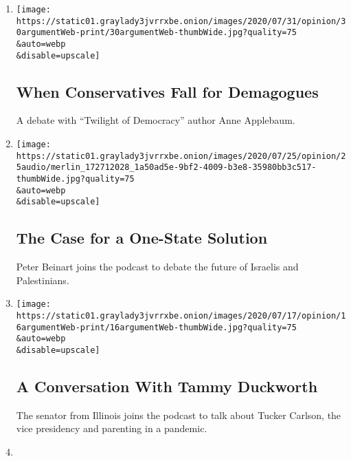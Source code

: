 \begin{enumerate}
\def\labelenumi{\arabic{enumi}.}
\item
  \href{/2020/07/30/opinion/the-argument-authoritarianism-anne-applebaum.html}{}

  \texttt{[image: https://static01.graylady3jvrrxbe.onion/images/2020/07/31/opinion/30argumentWeb-print/30argumentWeb-thumbWide.jpg?quality=75\\\&auto=webp\\\&disable=upscale]}

  \hypertarget{when-conservatives-fall-for-demagogues}{%
  \subsection{When Conservatives Fall for
  Demagogues}\label{when-conservatives-fall-for-demagogues}}

  A debate with ``Twilight of Democracy'' author Anne Applebaum.
\item
  \href{/2020/07/23/opinion/the-argument-israel-palestinian.html}{}

  \texttt{[image: https://static01.graylady3jvrrxbe.onion/images/2020/07/25/opinion/25audio/merlin\_172712028\_1a50ad5e-9bf2-4009-b3e8-35980bb3c517-thumbWide.jpg?quality=75\\\&auto=webp\\\&disable=upscale]}

  \hypertarget{the-case-for-a-one-state-solution}{%
  \subsection{The Case for a One-State
  Solution}\label{the-case-for-a-one-state-solution}}

  Peter Beinart joins the podcast to debate the future of Israelis and
  Palestinians.
\item
  \href{/2020/07/16/opinion/the-argument-tammy-duckworth.html}{}

  \texttt{[image: https://static01.graylady3jvrrxbe.onion/images/2020/07/17/opinion/16argumentWeb-print/16argumentWeb-thumbWide.jpg?quality=75\\\&auto=webp\\\&disable=upscale]}

  \hypertarget{a-conversation-with-tammy-duckworth}{%
  \subsection{A Conversation With Tammy
  Duckworth}\label{a-conversation-with-tammy-duckworth}}

  The senator from Illinois joins the podcast to talk about Tucker
  Carlson, the vice presidency and parenting in a pandemic.
\item
  \href{/2020/07/09/opinion/is-trumps-fate-sealed.html}{}


\end{enumerate}
